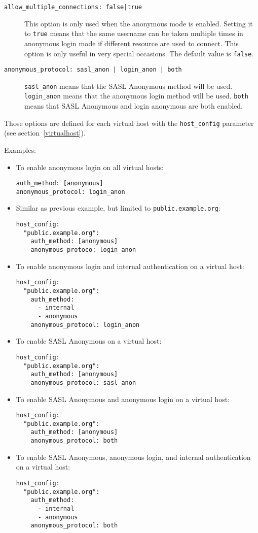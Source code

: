 \documentclass[a4paper,10pt]{book}
\newcommand{\bracehack}{\def\{{\char"7B}\def\}{\char"7D}}
\newcommand{\titem}[1]{\item[\bracehack\texttt{#1}]}
\newcommand{\jid}[1]{\texttt{#1}}
\newcommand{\term}[1]{\texttt{#1}}
\begin{document}
\begin{description}
\titem{allow\_multiple\_connections: false|true} This option is only used
  when the anonymous mode is
  enabled. Setting it to \term{true} means that the same username can be taken
  multiple times in anonymous login mode if different resource are used to
  connect. This option is only useful in very special occasions. The default
  value is \term{false}.
\titem{anonymous\_protocol: sasl\_anon | login\_anon | both} 
  \term{sasl\_anon} means
  that the SASL Anonymous method will be used. \term{login\_anon} means that the
  anonymous login method will be used. \term{both} means that SASL Anonymous and
  login anonymous are both enabled.
\end{description}

Those options are defined for each virtual host with the \term{host\_config}
parameter (see section~\ref{virtualhost}).

Examples:
\begin{itemize}
\item To enable anonymous login on all virtual hosts:
\begin{verbatim}
auth_method: [anonymous]
anonymous_protocol: login_anon
\end{verbatim}
\item Similar as previous example, but limited to \jid{public.example.org}:
\begin{verbatim}
host_config:
  "public.example.org":
    auth_method: [anonymous]
    anonymous_protoco: login_anon
\end{verbatim}
\item To enable anonymous login and internal authentication on a virtual host:
\begin{verbatim}
host_config:
  "public.example.org":
    auth_method:
      - internal
      - anonymous
    anonymous_protocol: login_anon
\end{verbatim}
\item To enable SASL Anonymous on a virtual host:
\begin{verbatim}
host_config:
  "public.example.org":
    auth_method: [anonymous]
    anonymous_protocol: sasl_anon
\end{verbatim}
\item To enable SASL Anonymous and anonymous login on a virtual host:
\begin{verbatim}
host_config:
  "public.example.org":
    auth_method: [anonymous]
    anonymous_protocol: both
\end{verbatim}
\item To enable SASL Anonymous, anonymous login, and internal authentication on
a virtual host:
\begin{verbatim}
host_config:
  "public.example.org":
    auth_method:
      - internal
      - anonymous
    anonymous_protocol: both
\end{verbatim}
\end{itemize}
\end{document}
